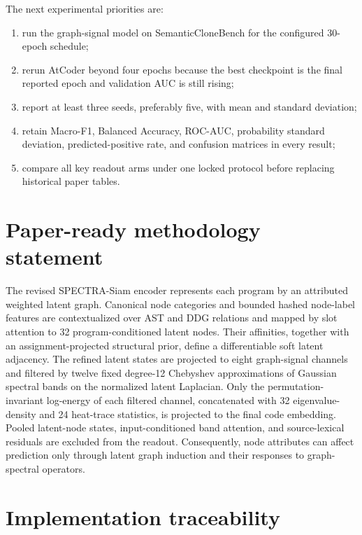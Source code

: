 \documentclass[11pt,a4paper]{article}
\begin{document}
The next experimental priorities are:
\begin{enumerate}
\item run the graph-signal model on SemanticCloneBench for the configured
30-epoch schedule;
\item rerun AtCoder beyond four epochs because the best checkpoint is the final
reported epoch and validation AUC is still rising;
\item report at least three seeds, preferably five, with mean and standard
deviation;
\item retain Macro-F1, Balanced Accuracy, ROC-AUC, probability standard
deviation, predicted-positive rate, and confusion matrices in every result;
\item compare all key readout arms under one locked protocol before replacing
historical paper tables.
\end{enumerate}

\section{Paper-ready methodology statement}

The revised SPECTRA-Siam encoder represents each program by an attributed
weighted latent graph. Canonical node categories and bounded hashed node-label
features are contextualized over AST and DDG relations and mapped by slot
attention to 32 program-conditioned latent nodes. Their affinities, together
with an assignment-projected structural prior, define a differentiable soft
latent adjacency. The refined latent states are projected to eight graph-signal
channels and filtered by twelve fixed degree-12 Chebyshev approximations of
Gaussian spectral bands on the normalized latent Laplacian. Only the
permutation-invariant log-energy of each filtered channel, concatenated with
32 eigenvalue-density and 24 heat-trace statistics, is projected to the final
code embedding. Pooled latent-node states, input-conditioned band attention,
and source-lexical residuals are excluded from the readout. Consequently, node
attributes can affect prediction only through latent graph induction and their
responses to graph-spectral operators.

\section{Implementation traceability}
\end{document}
